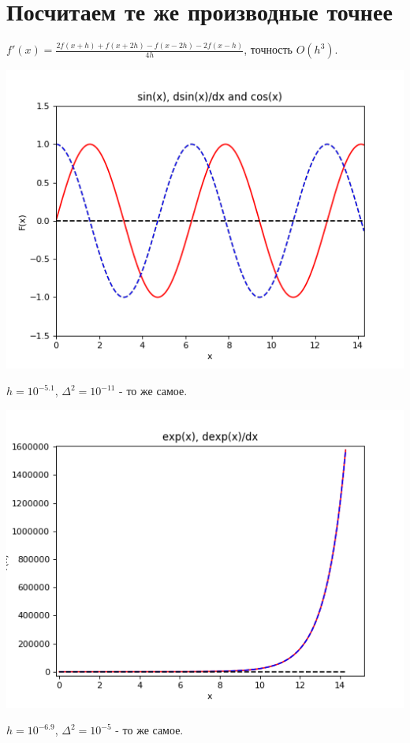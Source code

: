 \documentclass[12pt,a4paper]{scrartcl}
\begin{document}
	\section{Посчитаем те же производные точнее}
		$f'(x) = \frac{2 f(x+h) + f(x+2h) - f(x-2h) - 2 f(x-h)}{4h}$, точность $O(h^3)$.
		\begin{center}
			\includegraphics[scale=0.8]{figure_5} \\
		\end{center}
		$h = 10^{-5.1}$, $\Delta^2 = 10^{-11}$ - то же самое.
				\begin{center}
			\includegraphics[scale=0.74]{figure_6} \\
		\end{center}
		$h = 10^{-6.9}$, $\Delta^2 = 10^{-5}$ - то же самое.
\end{document}
